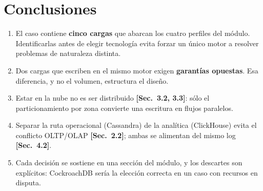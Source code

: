 \documentclass[11pt,a4paper]{article}
\newcommand{\sect}[1]{\textcolor{acento}{\textbf{[Sec.~#1]}}}
\begin{document}
\section{Conclusiones}
\begin{enumerate}[leftmargin=*,itemsep=3pt]
\item El caso contiene \textbf{cinco cargas} que abarcan los cuatro perfiles del
módulo. Identificarlas antes de elegir tecnología evita forzar un único motor a
resolver problemas de naturaleza distinta.

\item Dos cargas que escriben en el mismo motor exigen \textbf{garantías
opuestas}. Esa diferencia, y no el volumen, estructura el diseño.

\item Estar en la nube no es ser distribuido \sect{3.2, 3.3}: sólo el
particionamiento por zona convierte una escritura en flujos paralelos.

\item Separar la ruta operacional (Cassandra) de la analítica (ClickHouse) evita
el conflicto OLTP/OLAP \sect{2.2}; ambas se alimentan del mismo log \sect{4.2}.

\item Cada decisión se sostiene en una sección del módulo, y los descartes son
explícitos: CockroachDB sería la elección correcta en un caso con recursos en
disputa.
\end{enumerate}
\end{document}
